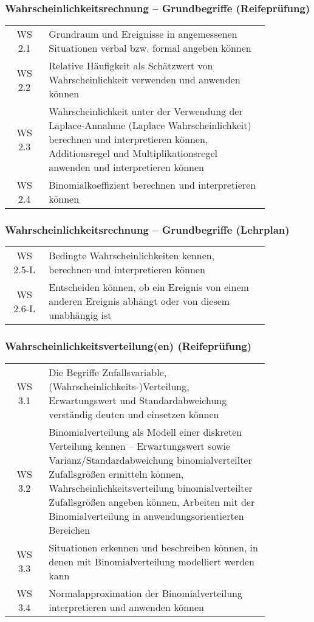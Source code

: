 \documentclass[a4paper,12pt]{article}
\begin{document}
\subsubsection{Wahrscheinlichkeitsrechnung -- Grundbegriffe (Reifeprüfung)}
\begin{tabular}{cp{0.85\linewidth}}
WS 2.1 & Grundraum und Ereignisse in angemessenen Situationen verbal bzw. formal angeben können\\
WS 2.2 & Relative Häufigkeit als Schätzwert von Wahrscheinlichkeit verwenden und anwenden können\\
WS 2.3 & Wahrscheinlichkeit unter der Verwendung der Laplace-Annahme (Laplace Wahrscheinlichkeit) berechnen und interpretieren können, Additionsregel und Multiplikationsregel anwenden und interpretieren können\\
WS 2.4 & Binomialkoeffizient berechnen und interpretieren können\\
\end{tabular}


\subsubsection{Wahrscheinlichkeitsrechnung -- Grundbegriffe (Lehrplan)}
\begin{em}
\begin{tabular}{cp{0.85\linewidth}}
WS 2.5-L & Bedingte Wahrscheinlichkeiten kennen, berechnen und interpretieren können\\
WS 2.6-L & Entscheiden können, ob ein Ereignis von einem anderen Ereignis abhängt oder von diesem unabhängig ist\\
\end{tabular}
\end{em}


\subsubsection{Wahrscheinlichkeitsverteilung(en) (Reifeprüfung)}
\begin{tabular}{cp{0.85\linewidth}}
WS 3.1 & Die Begriffe Zufallsvariable, (Wahrscheinlichkeits-)Verteilung, Erwartungswert und Standardabweichung verständig deuten und einsetzen können\\
WS 3.2 & Binomialverteilung als Modell einer diskreten Verteilung kennen -- Erwartungswert sowie Varianz/Standardabweichung binomialverteilter Zufallsgrößen ermitteln können, Wahrscheinlichkeitsverteilung binomialverteilter Zufallsgrößen angeben können, Arbeiten mit der Binomialverteilung in anwendungsorientierten Bereichen\\
WS 3.3 & Situationen erkennen und beschreiben können, in denen mit Binomialverteilung modelliert werden kann\\
WS 3.4 & Normalapproximation der Binomialverteilung interpretieren und anwenden können\\
\end{tabular}
\end{document}
